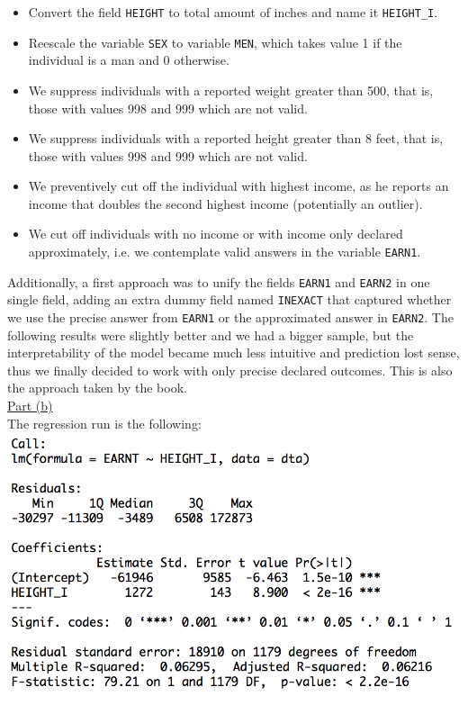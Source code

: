 \documentclass[a4paper, 11pt]{article}
\begin{document}
\begin{itemize}
\item Convert the field \texttt{HEIGHT} to total amount of inches and name it \texttt{HEIGHT\_I}.
\item Reescale the variable \texttt{SEX} to variable \texttt{MEN}, which takes value 1 if the individual is a man and 0 otherwise.
\item We suppress individuals with a reported weight greater than 500, that is, those with values 998 and 999 which are not valid.
\item We suppress individuals with a reported height greater than 8 feet, that is, those with values 998 and 999 which are not valid.
\item We preventively cut off the individual with highest income, as he reports an income that doubles the second highest income (potentially an outlier).
\item We cut off individuals with no income or with income only declared approximately, i.e. we contemplate valid answers in the variable \texttt{EARN1}.
\end{itemize}
Additionally, a first approach was to unify the fields \texttt{EARN1} and \texttt{EARN2} in one single field, adding an extra dummy field named \texttt{INEXACT} that captured whether we use the precise answer from \texttt{EARN1} or the approximated answer in \texttt{EARN2}. The following results were slightly better and we had a bigger sample, but the interpretability of the model became much less intuitive and prediction lost sense, thus we finally decided to work with only precise declared outcomes. This is also the approach taken by the book.\\
\newline \underline{Part (b)}\\
\newline The regression run is the following:\\
\includegraphics[scale=0.7]{reg1.png}
\end{document}
